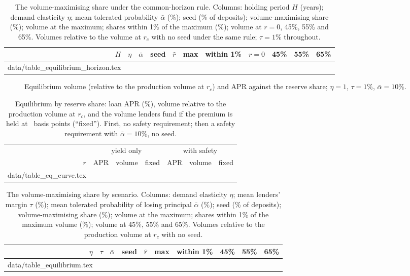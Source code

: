 \documentclass[preprint,11pt,authoryear]{elsarticle}
\makeatletter
\theoremstyle{definition}
\newcommand{\inputrows}[1]{\@@input #1 }
\makeatother
\begin{document}
\begin{table}[ht]
  \centering\small
  \caption{The volume-maximising share under the common-horizon rule. Columns: holding period $H$ (years); demand
  elasticity $\eta$; mean tolerated probability $\bar\alpha$ (\%); seed (\% of deposits); volume-maximising share (\%);
  volume at the maximum; shares within 1\% of the maximum (\%); volume at $r=0$, 45\%, 55\% and 65\%. Volumes relative
  to the volume at $r_c$ with no seed under the same rule; $\tau=1\%$ throughout.}
  \label{tab:horizon}
  \begin{tabular}{rrrrrrrrrrr}
    \toprule
    $H$ & $\eta$ & $\bar\alpha$ & seed & $\hat r$ & max & within 1\% & $r=0$ & 45\% & 55\% & 65\% \\
    \midrule
    \inputrows{data/table_equilibrium_horizon.tex}
    \bottomrule
  \end{tabular}
\end{table}

\begin{figure}[ht]
  \centering
  
  \caption{Equilibrium volume (relative to the production volume at $r_c$) and APR against the reserve share; $\eta=1$,
  $\tau=1\%$, $\bar\alpha=10\%$.}
  \label{fig:eq}
\end{figure}

\begin{table}[ht]
  \centering\small
  \caption{Equilibrium by reserve share: loan APR (\%), volume relative to the production volume at $r_c$, and the volume
  lenders fund if the premium is held at \PremBps\ basis points (``fixed''). First, no safety requirement; then a safety
  requirement with $\bar\alpha=10\%$, no seed.}
  \label{tab:eqcurve}
  \begin{tabular}{rrrrrrr}
    \toprule
    & \multicolumn{3}{c}{yield only} & \multicolumn{3}{c}{with safety} \\
    \cmidrule(lr){2-4}\cmidrule(lr){5-7}
    $r$ & APR & volume & fixed & APR & volume & fixed \\
    \midrule
    \inputrows{data/table_eq_curve.tex}
    \bottomrule
  \end{tabular}
\end{table}

\begin{table}[ht]
  \centering\small
  \caption{The volume-maximising share by scenario. Columns: demand elasticity $\eta$; mean lenders' margin $\tau$ (\%); mean
  tolerated probability of losing principal $\bar\alpha$ (\%); seed (\% of deposits); volume-maximising share (\%); volume
  at the maximum; shares within 1\% of the maximum volume (\%); volume at 45\%, 55\% and 65\%. Volumes relative to
  the production volume at $r_c$ with no seed.}
  \label{tab:eq}
  \begin{tabular}{rrrrrrrrrr}
    \toprule
    $\eta$ & $\tau$ & $\bar\alpha$ & seed & $\hat r$ & max & within 1\% & 45\% & 55\% & 65\% \\
    \midrule
    \inputrows{data/table_equilibrium.tex}
    \bottomrule
  \end{tabular}
\end{table}
\end{document}
